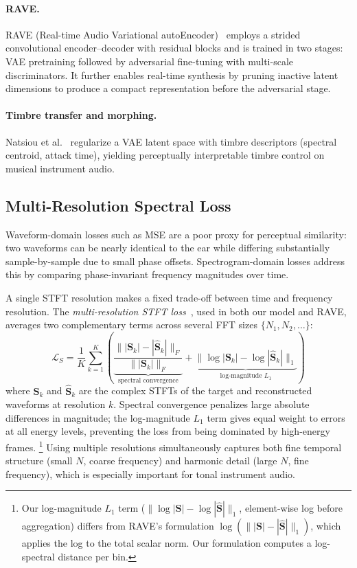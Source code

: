 \documentclass[10pt, twocolumn]{article}
\begin{document}
\paragraph{RAVE.}
RAVE (Real-time Audio Variational autoEncoder)~\cite{caillon2021ravevariationalautoencoderfast}
employs a strided convolutional encoder–decoder with residual
blocks and is trained in two stages: VAE pretraining followed by
adversarial fine-tuning with multi-scale discriminators.
It further enables real-time synthesis by pruning inactive latent dimensions
to produce a compact representation before the adversarial stage.

\paragraph{Timbre transfer and morphing.}
Natsiou et al.~\cite{natsiou2023interpretabletimbresynthesisusing} regularize a VAE latent space
with timbre descriptors (spectral centroid, attack time), yielding
perceptually interpretable timbre control on musical instrument audio.

\subsection{Multi-Resolution Spectral Loss}

Waveform-domain losses such as MSE are a poor proxy for perceptual
similarity: two waveforms can be nearly identical to the ear while
differing substantially sample-by-sample due to small phase offsets.
Spectrogram-domain losses address this by comparing phase-invariant
frequency magnitudes over time.

A single STFT resolution makes a fixed trade-off between time and
frequency resolution.
The \textit{multi-resolution STFT loss}~\cite{yamamoto2020parallelwaveganfastwaveform}, used
in both our model and RAVE, averages two complementary terms across
several FFT sizes $\{N_1, N_2, \ldots\}$:
\begin{equation}
    \mathcal{L}_S = \frac{1}{K}\sum_{k=1}^{K}
        \left( \underbrace{\frac{\||\mathbf{S}_k| - |\hat{\mathbf{S}}_k|\|_F}{\||\mathbf{S}_k|\|_F}}_{\text{spectral convergence}}
        + \underbrace{\|\log|\mathbf{S}_k| - \log|\hat{\mathbf{S}}_k|\|_1}_{\text{log-magnitude }L_1} \right)
    \label{eq:mrstft}
\end{equation}
where $\mathbf{S}_k$ and $\hat{\mathbf{S}}_k$ are the complex STFTs of
the target and reconstructed waveforms at resolution $k$.
Spectral convergence penalizes large absolute differences in magnitude;
the log-magnitude $L_1$ term gives equal weight to errors at all energy
levels, preventing the loss from being dominated by high-energy frames.%
\footnote{Our log-magnitude $L_1$ term ($\|\log|\mathbf{S}| -
\log|\hat{\mathbf{S}}|\|_1$, element-wise log before aggregation) differs from
RAVE's formulation $\log(\||\mathbf{S}| - |\hat{\mathbf{S}}|\|_1)$, which
applies the log to the total scalar norm. Our formulation computes a
log-spectral distance per bin.}
Using multiple resolutions simultaneously captures both fine temporal
structure (small $N$, coarse frequency) and harmonic detail
(large $N$, fine frequency), which is especially important for tonal
instrument audio.
\end{document}
